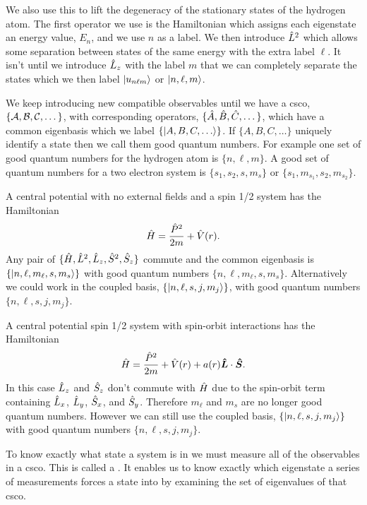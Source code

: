 We also use this to lift the degeneracy of the stationary states of the hydrogen atom.
The first operator we use is the Hamiltonian which assigns each eigenstate an energy value, \(E_n\), and we use \(n\) as a label.
We then introduce \(\hat{L}^2\) which allows some separation between states of the same energy with the extra label \(\ell\).
It isn't until we introduce \(\hat{L}_z\) with the label \(m\) that we can completely separate the states which we then label \(\vert {u_{n\ell m}} \rangle\) or \(\vert {n, \ell, m} \rangle\).

We keep introducing new compatible observables until we have a \acrfull{csco}, \(\{\mathcal{A}, \mathcal{B}, \mathcal{C}, \dotsc\}\), with corresponding operators, \(\{\hat{A}, \hat{B}, \hat{C}, \dotsc\}\), which have a common eigenbasis which we label \(\{\vert {A, B, C, \dotsc} \rangle\}\).
If \(\{A, B, C, \dotsc\}\) uniquely identify a state then we call them good quantum numbers.
For example one set of good quantum numbers for the hydrogen atom is \(\{n, \ell, m\}\).
A good set of quantum numbers for a two electron system is \(\{s_1, s_2, s, m_s\}\) or \(\{s_1, m_{s_1}, s_2, m_{s_2}\}\).

A central potential with no external fields and a spin 1/2 system has the Hamiltonian
\[\hat{H} = \frac{\hat{P}^2}{2m} + \hat{V}(r).\]
Any pair of \(\{\hat{H}, \hat{L}^2, \hat{L}_z, \hat{S}^2, \hat{S}_z\}\) commute and the common eigenbasis is \(\{\vert {n, \ell, m_\ell, s, m_s} \rangle\}\) with good quantum numbers \(\{n, \ell, m_\ell, s, m_s\}\).
Alternatively we could work in the coupled basis, \(\{\vert {n, \ell, s, j, m_j} \rangle\}\), with good quantum numbers \(\{n, \ell, s, j, m_j\}\).

A central potential spin 1/2 system with spin-orbit interactions has the Hamiltonian
\[\hat{H} = \frac{\hat{P}^2}{2m} + \hat{V}(r) + a(r)\bm{\hat{L}}\cdot\bm{\hat{S}}.\]
In this case \(\hat{L}_z\) and \(\hat{S}_z\) don't commute with \(\hat{H}\) due to the spin-orbit term containing \(\hat{L}_x\), \(\hat{L}_y\), \(\hat{S}_x\), and \(\hat{S}_y\).
Therefore \(m_\ell\) and \(m_s\) are no longer good quantum numbers.
However we can still use the coupled basis, \(\{\vert {n, \ell, s, j, m_j} \rangle\}\) with good quantum numbers \(\{n, \ell, s, j, m_j\}\).

To know exactly what state a system is in we must measure all of the observables in a \gls{csco}.
This is called a .
It enables us to know exactly which eigenstate a series of measurements forces a state into by examining the set of eigenvalues of that \gls{csco}.